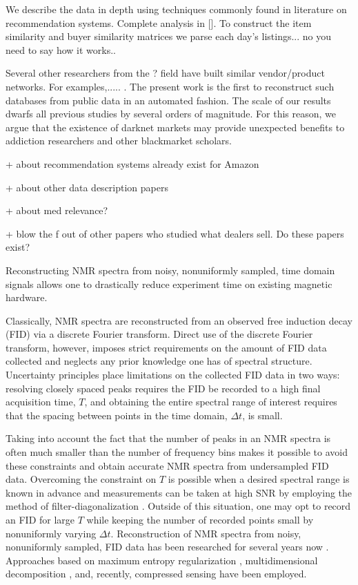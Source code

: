 \documentclass[11pt]{article}
\begin{document}
We describe the data in depth using techniques commonly found in literature on recommendation systems. Complete analysis in []. To construct the item similarity and buyer similarity matrices we parse each day's listings... no you need to say how it works..

Several other researchers from the ? field have built similar vendor/product networks. For examples,..... . The present work is the first to reconstruct such databases from public data in an automated fashion. The scale of our results dwarfs all previous studies by several orders of magnitude. For this reason, we argue that the existence of darknet markets may provide unexpected benefits to addiction researchers and other blackmarket scholars.







+ about recommendation systems already exist for Amazon

+ about other data description papers

+ about med relevance?

+ blow the f out of other papers who studied what dealers sell. Do these papers exist?





Reconstructing NMR spectra from noisy, nonuniformly sampled, time domain signals allows one to drastically reduce experiment time on existing magnetic hardware.

Classically, NMR spectra are reconstructed from an observed free induction decay (FID) via a discrete Fourier transform. Direct use of the discrete Fourier transform, however, imposes strict requirements on the amount of FID data collected and neglects any prior knowledge one has of spectral structure. Uncertainty principles place limitations on the collected FID data in two ways: resolving closely spaced peaks requires the FID be recorded to a high final acquisition time, $T$, and obtaining the entire spectral range of interest requires that the spacing between points in the time domain, $\Delta t$, is small.

Taking into account the fact that the number of peaks in an NMR spectra is often much smaller than the number of frequency bins makes it possible to avoid these constraints and obtain accurate NMR spectra from undersampled FID data. Overcoming the constraint on $T$ is possible when a desired spectral range is known in advance and measurements can be taken at high SNR by employing the method of filter-diagonalization \cite{Wall1995} \cite{Mandelshtam2001}. Outside of this situation, one may opt to record an FID for large $T$ while keeping the number of recorded points small by nonuniformly varying $\Delta t$. Reconstruction of NMR spectra from noisy, nonuniformly sampled, FID data has been researched for several years now \cite{Maciejewski2008}. Approaches based on maximum entropy regularization \cite{Mobli2008}, multidimensional decomposition \cite{Jaravine2006}, and, recently, compressed sensing \cite{Stern2007} have been employed.
\end{document}
